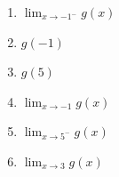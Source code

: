 \documentclass[12pt]{article}
\begin{document}
\begin{enumerate}
\begin{multicols}{3}
\begin{enumerate}
	\item $\lim_{x\to -1^-}g(x)$
	\vspace{2pc}
	
	\item $g(-1)$
	\vspace{2pc}
	
	\item $g(5)$
	\vspace{2pc}
	
	\item $\lim_{x\to -1}g(x)$
	\vspace{2pc}
	
	\item $\lim_{x\to 5^-}g(x)$
	\vspace{2pc}
	
	\item $\lim_{x\to 3}g(x)$	
\end{enumerate}
\end{multicols}

\end{enumerate}
\end{document}
